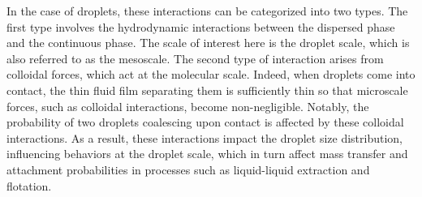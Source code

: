 In the case of droplets, these interactions can be categorized into two types. The first type involves the hydrodynamic interactions between the dispersed phase and the continuous phase. 
The scale of interest here is the droplet scale, which is also referred to as the mesoscale. 
The second type of interaction arises from colloidal forces, which act at the molecular scale.
Indeed, when droplets come into contact, the thin fluid film separating them is sufficiently thin so that microscale forces, such as colloidal interactions, become non-negligible. 
Notably, the probability of two droplets coalescing upon contact is affected by these colloidal interactions. 
As a result, these interactions impact the droplet size distribution, influencing behaviors at the droplet scale, which in turn affect mass transfer and attachment probabilities in processes such as liquid-liquid extraction and flotation.


